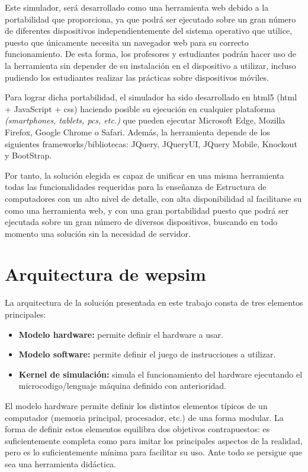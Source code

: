 Este simulador, será desarrollado como una herramienta web debido a la portabilidad que proporciona, ya que podrá ser ejecutado sobre un gran número de diferentes dispositivos independientemente del sistema operativo que utilice, puesto que únicamente necesita un navegador web para su correcto funcionamiento. De esta forma, los profesores y estudiantes podrán hacer uso de la herramienta sin depender de su instalación en el dispositivo a utilizar, incluso pudiendo los estudiantes realizar las prácticas sobre dispositivos móviles.

Para lograr dicha portabilidad, el simulador ha sido desarrollado en \acrshort{html}5 (\acrshort{html} + JavaScript + \acrshort{css}) haciendo posible su ejecución en cualquier plataforma \emph{(smartphones, tablets, \acrshort{pc}s, etc.)} que pueden ejecutar Microsoft Edge, Mozilla Firefox, Google Chrome o Safari. Además, la herramienta depende de los siguientes frameworks/bibliotecas: JQuery, JQueryUI, JQuery Mobile, Knockout y BootStrap.

Por tanto, la solución elegida es capaz de unificar en una misma herramienta todas las funcionalidades requeridas para la enseñanza de Estructura de computadores con un alto nivel de detalle, con alta disponibilidad al facilitarse su como una herramienta web, y con una gran portabilidad puesto que podrá ser ejecutada sobre un gran número de diversos dispositivos, buscando en todo momento una solución sin la necesidad de servidor.

\section{Arquitectura de \acrshort{wepsim}}
\label{sec:simulator_architecture}

La arquitectura de la solución presentada en este trabajo consta de tres elementos principales:

\begin{itemize}
\item \textbf{Modelo \gls{hardware}:} permite definir el \gls{hardware} a usar.
\item \textbf{Modelo \gls{software}:} permite definir el juego de instrucciones a utilizar.
\item \textbf{Kernel de simulación:} simula el funcionamiento del \gls{hardware} ejecutando el \gls{microcodigo}/lenguaje máquina definido con anterioridad.
\end{itemize}

El modelo \gls{hardware} permite definir los distintos elementos típicos de un computador (memoria principal, procesador, etc.) de una forma modular. La forma de definir estos elementos equilibra dos objetivos contrapuestos: es suficientemente completa como para imitar los principales aspectos de la realidad, pero es lo suficientemente mínima para facilitar su uso. Ante todo se persigue que sea una herramienta didáctica.

